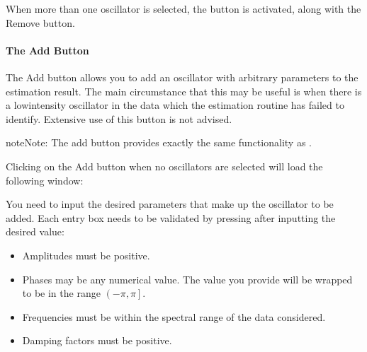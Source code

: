 \documentclass[letterpaper,10pt,english]{sphinxmanual}
\let\sphinxpxdimen\pdfpxdimen\else\newdimen\sphinxpxdimen
\begin{document}
\sphinxAtStartPar
When more than one oscillator is selected, the  button is activated,
along with the Remove button.


\paragraph{The Add Button}
\label{\detokenize{gui/usage/result:the-add-button}}
\sphinxAtStartPar
The Add button allows you to add an oscillator with arbitrary parameters to
the estimation result. The main circumstance that this may be useful is when
there is a low\sphinxhyphen{}intensity oscillator in the data which the estimation routine
has failed to identify. Extensive use of this button is not advised.

\begin{sphinxadmonition}{note}{Note:}
\sphinxAtStartPar
The add button provides exactly the same functionality as
{\hyperref[\detokenize{references/core:nmrespy.core.Estimator.add_oscillators}]{}}.
\end{sphinxadmonition}

\sphinxAtStartPar
Clicking on the Add button when no oscillators are selected will load the
following window:

\noindent{\hspace*{\fill}\sphinxincludegraphics[width=350\sphinxpxdimen]{{add_window}.png}\hspace*{\fill}}

\sphinxAtStartPar
You need to input the desired parameters that make up the oscillator to be
added. Each entry box needs to be validated by pressing  after
inputting the desired value:
\begin{itemize}
\item {} 
\sphinxAtStartPar
Amplitudes must be positive.

\item {} 
\sphinxAtStartPar
Phases may be any numerical value. The value you provide will be wrapped
to be in the range \(\left(-\pi, \pi\right]\).

\item {} 
\sphinxAtStartPar
Frequencies must be within the spectral range of the data considered.

\item {} 
\sphinxAtStartPar
Damping factors must be positive.

\end{itemize}
\end{document}
